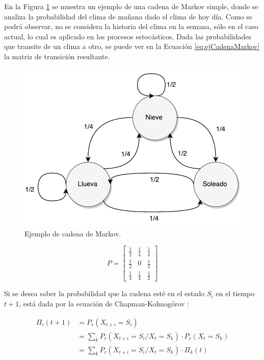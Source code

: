 En la Figura \ref{fig:ejCadenaMarkov} se muestra un ejemplo de una cadena de Markov simple, donde se analiza la probabilidad del clima de mañana dado el clima de hoy día. Como se podrá observar, no se considera la historia del clima en la semana, sólo en el caso actual, lo cual es aplicado en los procesos estocásticos. Dada las probabilidades que transite de un clima a otro, se puede ver en la Ecuación \ref{eq:ejCadenaMarkov} la matriz de transición resultante.

\begin{figure}
	\centering
	\includegraphics[scale=0.5]{images/EjCadenaMarkov.pdf}
	\caption{Ejemplo de cadena de Markov.}
	\label{fig:ejCadenaMarkov}
\end{figure}

\begin{equation} \label{eq:ejCadenaMarkov}
	P =
	\begin{bmatrix}
		\frac{1}{2} & \frac{1}{4} & \frac{1}{4} \\
		\frac{1}{2} & 0 & \frac{1}{2} \\
		\frac{1}{4} & \frac{1}{4} & \frac{1}{2}
	\end{bmatrix}	
\end{equation}

Si se desea saber la probabilidad que la cadena esté en el estado $S_i$ en el tiempo $t+1$, está dada por la ecuación de Chapman-Kolmogórov \citep{Papoulis1984}:

\begin{equation} \label{eq:chapman-kolmogorov1}
\begin{split}
	\Pi_{i} (t+1) &= P_r(X_{t+i}=S_i) \\
				  &= \sum _{k} P_r(X_{t+i} = S_i / X_t = S_k)·P_r(X_t = S_k)\\
				  &= \sum _{k} P_r(X_{t+i} = S_i / X_t = S_k)·\Pi_{k} (t)
\end{split}	
\end{equation}

